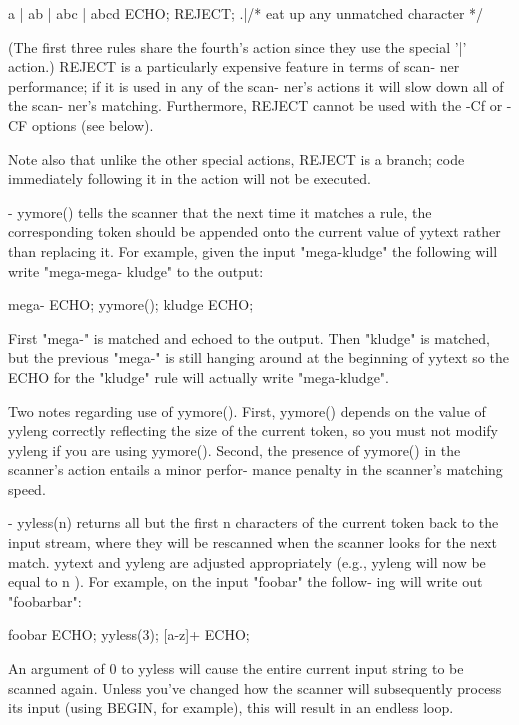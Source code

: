 \documentclass[12pt,spanish,twocolumn,lettersize]{article}
\begin{document}
		  a	   |
		  ab	   |
		  abc	   |
		  abcd	   ECHO; REJECT;
		  .|\n	   /* eat up any unmatched character */

	      (The  first  three  rules share the fourth's action
	      since they use the special '|' action.)  REJECT  is
	      a	 particularly expensive feature in terms of scan-
	      ner performance; if it is used in any of the  scan-
	      ner's  actions  it  will slow down all of the scan-
	      ner's matching.  Furthermore, REJECT cannot be used
	      with the -Cf or -CF options (see below).

	      Note  also  that	unlike the other special actions,
	      REJECT is a branch; code immediately  following  it
	      in the action will not be executed.

       -      yymore()	tells  the  scanner that the next time it
	      matches a rule, the corresponding token  should  be
	      appended	onto  the  current value of yytext rather
	      than replacing it.  For example,	given  the  input
	      "mega-kludge"  the following will write "mega-mega-
	      kludge" to the output:

		  mega-	   ECHO; yymore();
		  kludge   ECHO;

	      First "mega-" is matched and echoed to the  output.
	      Then  "kludge" is matched, but the previous "mega-"
	      is still hanging around at the beginning of  yytext
	      so  the  ECHO  for  the "kludge" rule will actually
	      write "mega-kludge".

       Two notes regarding  use	 of  yymore().	 First,	 yymore()
       depends	on  the	 value of yyleng correctly reflecting the
       size of the current token, so you must not  modify  yyleng
       if  you	are  using  yymore().	Second,	 the  presence of
       yymore() in the scanner's action entails a  minor  perfor-
       mance penalty in the scanner's matching speed.

       -      yyless(n) returns all but the first n characters of
	      the current token back to the input  stream,  where
	      they  will  be rescanned when the scanner looks for
	      the next match.  yytext  and  yyleng  are	 adjusted
	      appropriately  (e.g., yyleng will now be equal to n
	      ).  For example, on the input "foobar" the  follow-
	      ing will write out "foobarbar":

		  foobar    ECHO; yyless(3);
		  [a-z]+    ECHO;

	      An  argument  of	0 to yyless will cause the entire
	      current input string to be scanned  again.   Unless
	      you've  changed  how  the scanner will subsequently
	      process its input (using BEGIN, for example),  this
	      will result in an endless loop.
\end{document}
